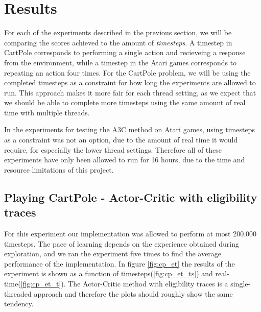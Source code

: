 \documentclass[11pt]{article}
\begin{document}
\section{Results}

For each of the experiments described in the previous section, we will be comparing the
scores achieved to the amount of \textit{timesteps}. 
A timestep in CartPole corresponds to performing a single action and recieveing a response
from the environment, while a timestep in the Atari games corresponds to repeating an action
four times.
For the CartPole problem, we will be using the completed timesteps as a constraint for
how long the experiments are allowed to run.
This approach makes it more fair for each thread setting, as we expect 
that we should be able to complete more timesteps using the same amount of real time
with multiple threads.

In the experiments for testing the A3C method on Atari games, using timesteps as a constraint
was not an option, due to the amount of real time it would require, for especially the lower thread settings.
Therefore all of these experiments have only been allowed to run for 16 hours,
due to the time and resource limitations of this project.

\subsection{Playing CartPole - Actor-Critic with eligibility traces}

For this experiment our implementation was allowed to perform at most 200.000 timesteps.
The pace of learning depends on the experience obtained during exploration,
and we ran the experiment five times to find the average performance of
the implementation.
In figure \ref{fig:cp_et} the results of the experiment is shown
as a function of timesteps(\ref{fig:cp_et_ts}) and real-time(\ref{fig:cp_et_t}).
The Actor-Critic method with eligibility traces is a single-threaded
approach and therefore the plots should roughly show the same tendency.
\end{document}

